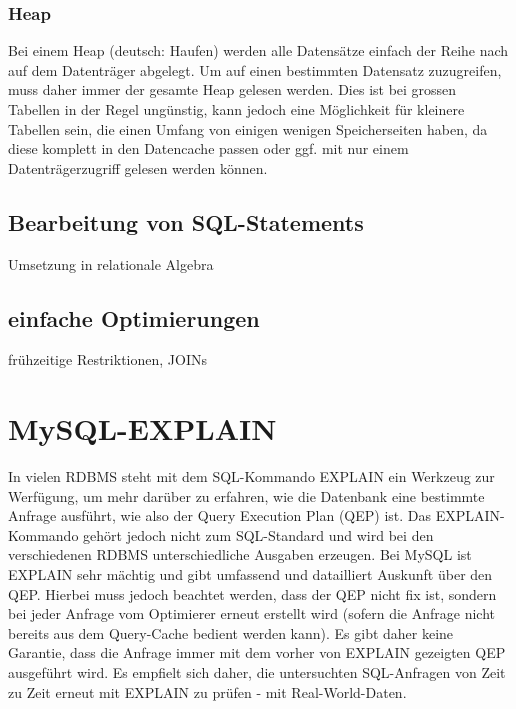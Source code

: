 \subsubsection{Heap} 
Bei einem Heap (deutsch: Haufen) werden alle Datensätze einfach der Reihe nach auf dem Datenträger abgelegt. Um auf einen bestimmten Datensatz zuzugreifen, muss daher immer der gesamte Heap gelesen werden. Dies ist bei grossen Tabellen in der Regel ungünstig, kann jedoch eine Möglichkeit für kleinere Tabellen sein, die einen Umfang von einigen wenigen Speicherseiten haben, da diese komplett in den Datencache passen oder ggf. mit nur einem Datenträgerzugriff gelesen werden können.

\subsection{Bearbeitung von SQL-Statements}
Umsetzung in relationale Algebra

\subsection{einfache Optimierungen}
frühzeitige Restriktionen, JOINs
\section{MySQL-EXPLAIN}
In vielen RDBMS steht mit dem SQL-Kommando EXPLAIN ein Werkzeug zur Werfügung, um mehr darüber zu erfahren, wie die Datenbank eine bestimmte Anfrage ausführt, wie also der Query Execution Plan (QEP) ist. Das EXPLAIN-Kommando gehört jedoch nicht zum SQL-Standard und wird bei den verschiedenen RDBMS unterschiedliche Ausgaben erzeugen. Bei MySQL ist EXPLAIN sehr mächtig und gibt umfassend und datailliert Auskunft über den QEP. Hierbei muss jedoch beachtet werden, dass der QEP nicht fix ist, sondern bei jeder Anfrage vom Optimierer erneut erstellt wird (sofern die Anfrage nicht bereits aus dem Query-Cache bedient werden kann). Es gibt daher keine Garantie, dass die Anfrage immer mit dem vorher von EXPLAIN gezeigten QEP ausgeführt wird. Es empfielt sich daher, die untersuchten SQL-Anfragen von Zeit zu Zeit erneut mit EXPLAIN zu prüfen - mit Real-World-Daten.

